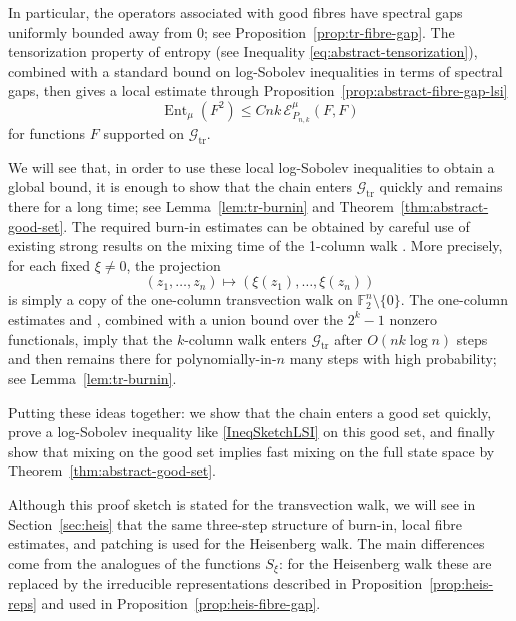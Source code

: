 \documentclass[11pt, reqno]{amsart}
\numberwithin{equation}{section}
\newcommand{\Ft}{\mathbb F_2}
\newcommand{\Ent}{\operatorname{Ent}}
\newcommand{\cE}{\mathcal E}
\newcommand{\Good}{\mathcal G}
\begin{document}
In particular, the operators associated with good fibres have spectral gaps uniformly bounded away from 0; see Proposition~\ref{prop:tr-fibre-gap}. The tensorization property of entropy (see Inequality \eqref{eq:abstract-tensorization}), combined with a standard bound on log-Sobolev inequalities in terms of spectral gaps, then gives a local estimate through Proposition~\ref{prop:abstract-fibre-gap-lsi}
\begin{equation} \label{IneqSketchLSI}
\Ent_\mu(F^2)\le C nk\,\cE_{P_{n,k}}^\mu(F,F)
\end{equation}
for functions $F$ supported on \(\Good_{\mathrm{tr}}\).



We will see that, in order to use these local log-Sobolev inequalities to obtain a global bound, it is enough to show that the chain enters \(\Good_{\mathrm{tr}}\) quickly and remains there for a long time; see Lemma~\ref{lem:tr-burnin} and Theorem~\ref{thm:abstract-good-set}. The required burn-in estimates can be obtained by careful use of existing strong results on the mixing time of the 1-column walk \cite[Theorem~1]{BenHamouPeres2018}. More precisely, for each fixed \(\xi\ne0\), the projection
\[
(z_1,\ldots,z_n)\mapsto(\xi(z_1),\ldots,\xi(z_n))
\]
is simply a copy of the one-column transvection walk on \(\Ft^n\setminus\{0\}\).
The one-column estimates \cite[Theorem~1]{BenHamouPeres2018} and
\cite[Theorem~1.1]{PeresTanakaZhai2020}, combined with a union bound over the \(2^k-1\) nonzero
functionals, imply that the \(k\)-column walk enters \(\Good_{\mathrm{tr}}\)
after \(O(nk\log n)\) steps and then remains there for polynomially-in-$n$ many steps
with high probability; see Lemma~\ref{lem:tr-burnin}.

Putting these ideas together: we show that the chain enters a good set quickly, prove a log-Sobolev inequality like \eqref{IneqSketchLSI} on this good set, and finally show that mixing on the good set implies fast mixing on the full state space by Theorem~\ref{thm:abstract-good-set}.

Although this proof sketch is stated for the transvection walk, we will see in Section~\ref{sec:heis} that the same three-step structure of burn-in, local fibre estimates, and patching is used for the Heisenberg walk.  The main differences come from the analogues of the functions $S_{\xi}$: for the Heisenberg walk these are replaced by the irreducible representations described in Proposition~\ref{prop:heis-reps} and used in Proposition~\ref{prop:heis-fibre-gap}.
\end{document}
